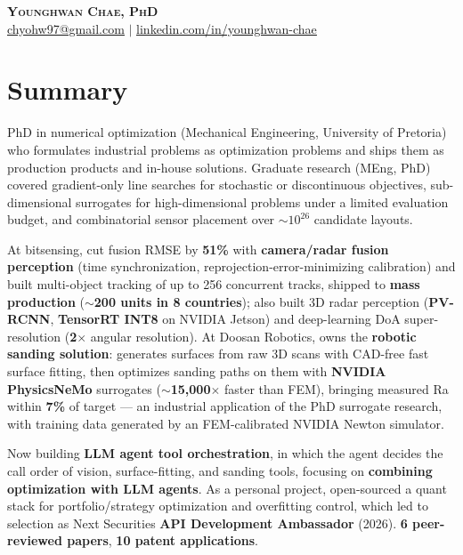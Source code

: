 \documentclass[letterpaper,11pt]{article}
\begin{document}
\begin{center}
    \textbf{\Huge \scshape Younghwan Chae, PhD} \\ \vspace{3pt}
    \small
    \href{mailto:chyohw97@gmail.com}{\underline{chyohw97@gmail.com}} \quad$|$\quad
    \href{https://www.linkedin.com/in/younghwan-chae/}{\underline{linkedin.com/in/younghwan-chae}}
\end{center}

\section{Summary}
\small{
PhD in numerical optimization (Mechanical Engineering, University of Pretoria) who formulates industrial problems as optimization problems and ships them as production products and in-house solutions. Graduate research (MEng, PhD) covered gradient-only line searches for stochastic or discontinuous objectives, sub-dimensional surrogates for high-dimensional problems under a limited evaluation budget, and combinatorial sensor placement over $\sim$$10^{26}$ candidate layouts.

\vspace{2pt}\noindent At bitsensing, cut fusion RMSE by \textbf{51\%} with \textbf{camera/radar fusion perception} (time synchronization, reprojection-error-minimizing calibration) and built multi-object tracking of up to 256 concurrent tracks, shipped to \textbf{mass production} ($\sim$\textbf{200 units in 8 countries}); also built 3D radar perception (\textbf{PV-RCNN}, \textbf{TensorRT INT8} on NVIDIA Jetson) and deep-learning DoA super-resolution (\textbf{2$\times$} angular resolution). At Doosan Robotics, owns the \textbf{robotic sanding solution}: generates surfaces from raw 3D scans with CAD-free fast surface fitting, then optimizes sanding paths on them with \textbf{NVIDIA PhysicsNeMo} surrogates (\textbf{$\sim$15,000$\times$} faster than FEM), bringing measured Ra within \textbf{7\%} of target --- an industrial application of the PhD surrogate research, with training data generated by an FEM-calibrated NVIDIA Newton simulator.

\vspace{2pt}\noindent Now building \textbf{LLM agent tool orchestration}, in which the agent decides the call order of vision, surface-fitting, and sanding tools, focusing on \textbf{combining optimization with LLM agents}. As a personal project, open-sourced a quant stack for portfolio/strategy optimization and overfitting control, which led to selection as Next Securities \textbf{API Development Ambassador} (2026). \textbf{6 peer-reviewed papers}, \textbf{10 patent applications}.
}
\end{document}
